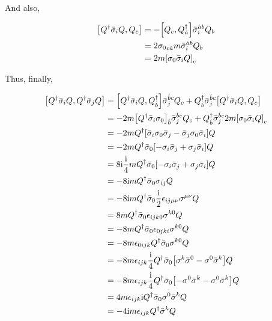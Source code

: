 And also,

\begin{align}
    \comm{Q^\dagger{\bar\sigma}_iQ}{Q_c}&=-\comm{Q_c}{Q^\dagger_{\dot a}}{{\bar\sigma}_i}^{\dot a b}Q_b\nonumber\\
    &=2{\sigma_0}_{c\dot a}m{{\bar\sigma}_i}^{\dot a b}Q_b\nonumber\\
    &=2m\qty[{\sigma_0}{{\bar\sigma}_i}Q]_c\nonumber
\end{align}

Thus, finally,

\begin{align}
    \comm{Q^\dagger{\bar\sigma}_iQ}{Q^\dagger{\bar\sigma}_j Q}&=\comm{Q^\dagger{\bar\sigma}_iQ}{Q^\dagger_{\dot b}}{{\bar\sigma}_j}^{\dot b c}Q_c+Q^\dagger_{\dot b}{{\bar\sigma}_j}^{\dot b c}\comm{Q^\dagger{\bar\sigma}_iQ}{Q_c}\nonumber\\
    &=-2m\qty[Q^\dagger{{\bar\sigma}_i}{\sigma_0}]_{\dot b}{{\bar\sigma}_j}^{\dot b c}Q_c+Q^\dagger_{\dot b}{{\bar\sigma}_j}^{\dot b c}2m\qty[{\sigma_0}{{\bar\sigma}_i}Q]_c\nonumber\\
    &=-2mQ^\dagger\qty[{\bar\sigma}_i\sigma_0{\bar\sigma}_j-{\bar\sigma}_j\sigma_0{\bar\sigma}_i]Q\nonumber\\
    &=-2mQ^\dagger{\bar\sigma}_0\qty[-\sigma_i{\bar\sigma}_j+\sigma_j{\bar\sigma}_i]Q\nonumber\\
    &=8\im\frac\im4mQ^\dagger{\bar\sigma}_0\qty[-\sigma_i{\bar\sigma}_j+\sigma_j{\bar\sigma}_i]Q\nonumber\\
    &=-8\im mQ^\dagger{\bar\sigma}_0\sigma_{ij}Q\nonumber\\
    &=-8\im mQ^\dagger{\bar\sigma}_0\frac\im2\epsilon_{ij\mu\nu}\sigma^{\mu\nu}Q\nonumber\\
    &=8 mQ^\dagger{\bar\sigma}_0\epsilon_{ijk0}\sigma^{k0}Q\nonumber\\
    &=-8 mQ^\dagger{\bar\sigma}_0\epsilon_{0jki}\sigma^{k0}Q\nonumber\\
    &=-8 m\epsilon_{0ijk}Q^\dagger{\bar\sigma}_0\sigma^{k0}Q\nonumber\\
    &=-8 m\epsilon_{ijk}\frac\im 4Q^\dagger{\bar\sigma}_0\qty[\sigma^k{\bar\sigma}^0-\sigma^0{\bar\sigma^k}]Q\nonumber\\
    &=-8 m\epsilon_{ijk}\frac\im 4Q^\dagger{\bar\sigma}_0\qty[-\sigma^0{\bar\sigma}^k-\sigma^0{\bar\sigma^k}]Q\nonumber\\
    &=4 m\epsilon_{ijk}\im Q^\dagger{\bar\sigma}_0\sigma^0{\bar\sigma}^kQ\nonumber\\
    &=-4\im  m\epsilon_{ijk}Q^\dagger{\bar\sigma}^kQ\nonumber
\end{align}

